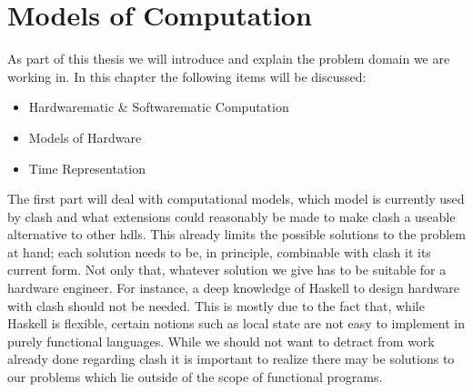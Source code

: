 \newcommand{\framedhslinecorrect}[2]%
  {#1[#2]}

\newcommand{\framedhs}{\sethscode{framedhscode}}


\newenvironment{inlinehscode}%
  {\(\def\column##1##2{}%
   \let\>\undefined\let\<\undefined\let\\\undefined
   \newcommand\>[1][]{}\newcommand\<[1][]{}\newcommand\\[1][]{}%
   \def\fromto##1##2##3{##3}%
   \def\nextline{}}{\) }%

\newcommand{\inlinehs}{\sethscode{inlinehscode}}


\newenvironment{joincode}%
  {\let\orighscode=\hscode
   \let\origendhscode=\endhscode
   \def\endhscode{\def\hscode{\endgroup\def\@currenvir{hscode}\\}\begingroup}
   \orighscode\def\hscode{\endgroup\def\@currenvir{hscode}}}%
  {\origendhscode
   \global\let\hscode=\orighscode
   \global\let\endhscode=\origendhscode}%

\makeatother
\EndFmtInput
%

\chapter{Models of Computation}
As part of this thesis we will introduce and explain the problem domain we are working in. 
In this chapter the following items will be discussed:
\begin{itemize}
 \item Hardwarematic \& Softwarematic Computation
 \item Models of Hardware
 \item Time Representation 
\end{itemize}

The first part will deal with computational models, which model is currently used by \gls{clash} and what extensions could reasonably be made to make \gls{clash} a useable alternative to other \gls{hdl}s. 
This already limits the possible solutions to the problem at hand; each solution needs to be, in principle, combinable with \gls{clash} it its current form.
Not only that, whatever solution we give has to be suitable for a hardware engineer. 
For instance, a deep knowledge of Haskell to design hardware with \gls{clash} should not be needed.
This is mostly due to the fact that, while Haskell is flexible, certain notions such as local state are not easy to implement in purely functional languages.
While we should not want to detract from work already done regarding \gls{clash} it is important to realize there may be solutions to our problems which lie outside of the scope of functional programs.


